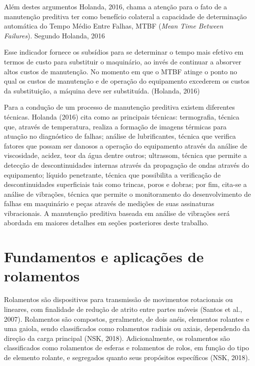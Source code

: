 \documentclass[
	12pt,				
	oneside,			
	a4paper,			
	english,			
	brazil				
	]{abntex2ppgsi}
\begin{document}
Além destes argumentos Holanda, 2016, chama a atenção para o fato de a manutenção preditiva ter como benefício colateral a capacidade de determinação automática do Tempo Médio Entre Falhas, MTBF (\textit{Mean Time Between Failures}). Segundo Holanda, 2016

\begin{citacao}
Esse indicador fornece os subsídios para se determinar o tempo mais efetivo em termos de custo para substituir o maquinário, ao invés de continuar a absorver altos custos de manutenção. No momento em que o MTBF atinge o ponto no qual os custos de manutenção e de operação do equipamento excederem os custos da substituição, a máquina deve ser substituída. (Holanda, 2016)
\end{citacao}

Para a condução de um processo de manutenção preditiva existem diferentes técnicas. Holanda (2016) cita como as principais técnicas: termografia, técnica que, através de temperatura, realiza a formação de imagens térmicas para atuação no diagnóstico de falhas; análise de lubrificantes, técnica que verifica fatores que possam ser danosos a operação do equipamento através da análise de viscosidade, acidez, teor da água dentre outros; ultrassom, técnica que permite a detecção de descontinuidades internas através da propagação de ondas através do equipamento; líquido penetrante, técnica que possibilita a verificação de descontinuidades superficiais tais como trincas, poros e dobras; por fim, cita-se a análise de vibrações, técnica que permite o monitoramento do desenvolvimento de falhas em maquinário e peças através de medições de suas assinaturas vibracionais. A manutenção preditiva baseada em análise de vibrações será abordada em maiores detalhes em seções posteriores deste trabalho.

\section{\textbf{Fundamentos e aplicações de rolamentos}}
Rolamentos são dispositivos para transmissão de movimentos rotacionais ou lineares, com finalidade de redução de atrito entre partes móveis (Santos et al., 2007). Rolamentos são compostos, geralmente, de dois anéis, elementos rolantes e uma gaiola, sendo classificados como rolamentos radiais ou axiais, dependendo da direção da carga principal (NSK, 2018). Adicionalmente, os rolamentos são classificados como rolamentos de esferas e rolamentos de rolos, em função do tipo de elemento rolante, e segregados quanto seus propósitos específicos (NSK, 2018).
\end{document}
